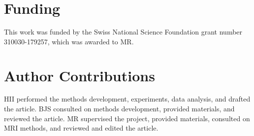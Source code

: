 \section{Funding}
This work was funded by the Swiss National Science Foundation grant number 310030-179257, which was awarded to MR.

\section{Author Contributions}
HII performed the methods development, experiments, data analysis, and drafted the article.
BJS consulted on methods development, provided materials, and reviewed the article.
MR supervised the project, provided materials, consulted on MRI methods, and reviewed and edited the article.
